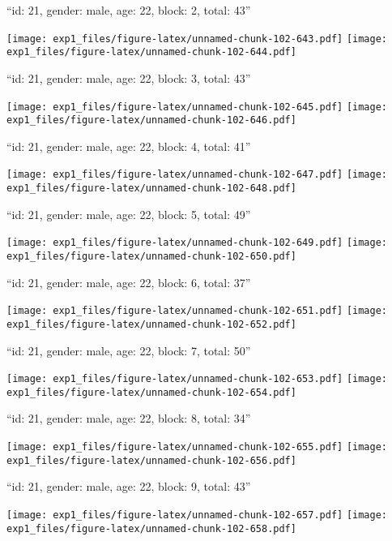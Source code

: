 \documentclass[11pt,,]{article}
\begin{document}
\newpage
[1] 

``id: 21, gender: male, age: 22, block: 2, total: 43''

\texttt{[image: exp1\_files/figure-latex/unnamed-chunk-102-643.pdf]}
\texttt{[image: exp1\_files/figure-latex/unnamed-chunk-102-644.pdf]}

\newpage
[1] 

``id: 21, gender: male, age: 22, block: 3, total: 43''

\texttt{[image: exp1\_files/figure-latex/unnamed-chunk-102-645.pdf]}
\texttt{[image: exp1\_files/figure-latex/unnamed-chunk-102-646.pdf]}

\newpage
[1] 

``id: 21, gender: male, age: 22, block: 4, total: 41''

\texttt{[image: exp1\_files/figure-latex/unnamed-chunk-102-647.pdf]}
\texttt{[image: exp1\_files/figure-latex/unnamed-chunk-102-648.pdf]}

\newpage
[1] 

``id: 21, gender: male, age: 22, block: 5, total: 49''

\texttt{[image: exp1\_files/figure-latex/unnamed-chunk-102-649.pdf]}
\texttt{[image: exp1\_files/figure-latex/unnamed-chunk-102-650.pdf]}

\newpage
[1] 

``id: 21, gender: male, age: 22, block: 6, total: 37''

\texttt{[image: exp1\_files/figure-latex/unnamed-chunk-102-651.pdf]}
\texttt{[image: exp1\_files/figure-latex/unnamed-chunk-102-652.pdf]}

\newpage
[1] 

``id: 21, gender: male, age: 22, block: 7, total: 50''

\texttt{[image: exp1\_files/figure-latex/unnamed-chunk-102-653.pdf]}
\texttt{[image: exp1\_files/figure-latex/unnamed-chunk-102-654.pdf]}

\newpage
[1] 

``id: 21, gender: male, age: 22, block: 8, total: 34''

\texttt{[image: exp1\_files/figure-latex/unnamed-chunk-102-655.pdf]}
\texttt{[image: exp1\_files/figure-latex/unnamed-chunk-102-656.pdf]}

\newpage
[1] 

``id: 21, gender: male, age: 22, block: 9, total: 43''

\texttt{[image: exp1\_files/figure-latex/unnamed-chunk-102-657.pdf]}
\texttt{[image: exp1\_files/figure-latex/unnamed-chunk-102-658.pdf]}
\end{document}
